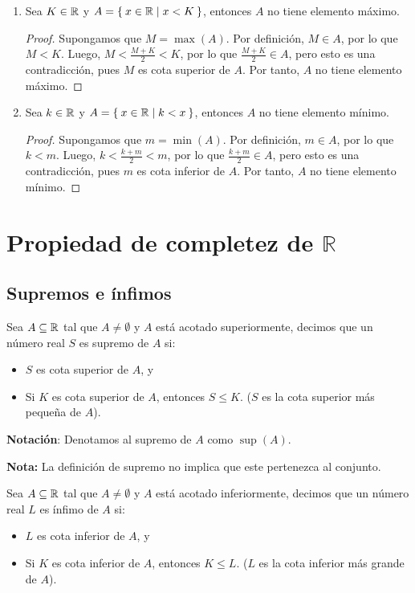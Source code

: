 \begin{enumerate}[label=\alph*)]
  \item Sea $K\in \mathbb{R}$ y $A=\Set{x\in \mathbb{R}|x<K}$, entonces $A$ no tiene elemento máximo.
  \begin{proof}\leavevmode
    Supongamos que $M=\max(A)$. Por definición, $M\in A$, por lo que $M<K$. Luego, $M<\frac{M+K}{2}<K$, por lo que $\frac{M+K}{2}\in A$, pero esto es una contradicción, pues $M$ es cota superior de $A$. Por tanto, $A$ no tiene elemento máximo.
  \end{proof}
  
  \item Sea $k\in \mathbb{R}$ y $A=\Set{x\in \mathbb{R}|k<x}$, entonces $A$ no tiene elemento mínimo.
  
  \begin{proof}
    Supongamos que $m=\min(A)$. Por definición, $m\in A$, por lo que $k<m$. Luego, $k<\frac{k+m}{2}<m$, por lo que $\frac{k+m}{2}\in A$, pero esto es una contradicción, pues $m$ es cota inferior de $A$. Por tanto, $A$ no tiene elemento mínimo.
  \end{proof}
  
\end{enumerate}

\section*{Propiedad de completez de \(\mathbb{R}\)}

\subsection*{Supremos e ínfimos}

 Sea $A\subseteq \mathbb{R}$ tal que $A\neq \emptyset$ y $A$ está acotado superiormente, decimos que un número real $S$ es supremo de $A$ si:
\begin{itemize}
 \item $S$ es cota superior de $A$, y
 \item Si $K$ es cota superior de $A$, entonces $S\leq K$. ($S$ es la cota superior más pequeña de $A$).
\end{itemize}

\textbf{Notación}: Denotamos al supremo de $A$ como $\sup(A)$.

\textbf{Nota:} La definición de supremo no implica que este pertenezca al conjunto.

 Sea $A\subseteq \mathbb{R}$ tal que $A\neq \emptyset$ y $A$ está acotado inferiormente, decimos que un número real $L$ es ínfimo de $A$ si: \begin{itemize}
 \item $L$ es cota inferior de $A$, y
 \item Si $K$ es cota inferior de $A$, entonces $K\leq L$. ($L$ es la cota inferior más grande de $A$).
\end{itemize}


